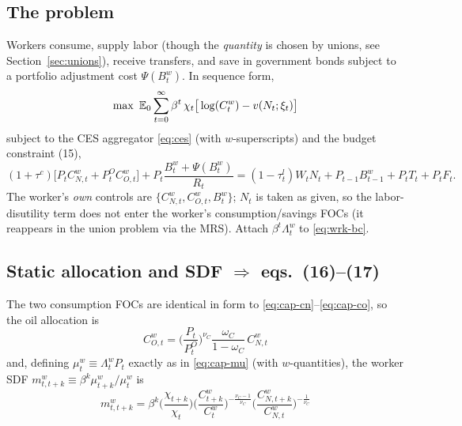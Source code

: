 \subsection{The problem}
Workers consume, supply labor (though the \emph{quantity} is chosen by unions, see
Section~\ref{sec:unions}), receive transfers, and save in government bonds subject to a portfolio
adjustment cost $\Psi(B^w_t)$. In sequence form,
\begin{equation}\label{eq:wrk-obj}
\max\ \E_0\sum_{t=0}^\infty\beta^t\,\chi_t\big[\log(C^w_t)-v(N_t;\xi_t)\big]
\end{equation}
subject to the CES aggregator \eqref{eq:ces} (with $w$-superscripts) and the budget constraint (15),
\begin{equation}\label{eq:wrk-bc}
(1+\tau^c)\big[P_tC^w_{N,t}+P^O_tC^w_{O,t}\big]+P_t\frac{B^w_t+\Psi(B^w_t)}{R_t}
=(1-\tau^l_t)W_tN_t+P_{t-1}B^w_{t-1}+P_tT_t+P_tF_t .
\tag{P-15}
\end{equation}
The worker's \emph{own} controls are $\{C^w_{N,t},C^w_{O,t},B^w_t\}$; $N_t$ is taken as given, so the
labor-disutility term does not enter the worker's consumption/savings FOCs (it reappears in the union
problem via the MRS). Attach $\beta^t\Lambda^w_t$ to \eqref{eq:wrk-bc}.

\subsection{Static allocation and SDF \texorpdfstring{$\Rightarrow$}{=>} eqs.\ (16)--(17)}
The two consumption FOCs are identical in form to \eqref{eq:cap-cn}--\eqref{eq:cap-co}, so the oil
allocation is
\begin{equation}\label{eq:17}
\boxed{\,C^w_{O,t}=\Big(\frac{P_t}{P^O_t}\Big)^{\nu_C}\frac{\omega_C}{1-\omega_C}\,C^w_{N,t}\,}
\tag{P-17}
\end{equation}
and, defining $\mu^w_t\equiv\Lambda^w_tP_t$ exactly as in \eqref{eq:cap-mu} (with $w$-quantities), the
worker SDF $m^w_{t,t+k}\equiv\beta^k\mu^w_{t+k}/\mu^w_t$ is
\begin{equation}\label{eq:16}
\boxed{\,m^w_{t,t+k}=\beta^k\Big(\frac{\chi_{t+k}}{\chi_t}\Big)
\Big(\frac{C^w_{t+k}}{C^w_t}\Big)^{-\frac{\nu_C-1}{\nu_C}}
\Big(\frac{C^w_{N,t+k}}{C^w_{N,t}}\Big)^{-\frac1{\nu_C}}\,}\tag{P-16}
\end{equation}


